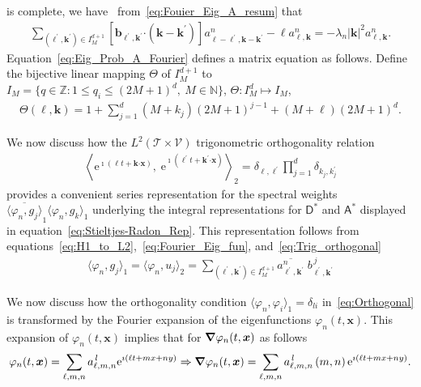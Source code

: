 \documentclass[leqno,onefignum,onetabnum]{siamltex1213}
\newcommand{\e}{\mathrm{e}}
\newcommand{\Tc}{\mathcal{T}}
\newcommand{\Vc}{\mathcal{V}}
\newcommand{\Dm}{\mathsf{D}}
\newcommand{\Am}{\mathsf{A}}
\newcommand\bnabla{\mbox{\boldmath${\nabla}$}}
\providecommand\bcdot{\boldsymbol{\cdot}}
\newcommand{\vecb}{\boldsymbol{b}}
\newcommand{\vecx}{\boldsymbol{x}}
\newcommand{\veck}{\boldsymbol{k}}
\begin{document}
is complete, we have~\cite{Stone:64,Keener-2000}
from~\eqref{eq:Fouier_Eig_A_resum} that 
%
\begin{align}\label{eq:Eig_Prob_A_Fourier}
  \sum_{(\ell^\prime,\veck^\prime)\in I_M^{d+1}}
  \left[\vecb_{\ell^\prime,\veck^\prime}\bcdot(\veck-\veck^\prime)
       \right]a^n_{\ell-\ell^\prime,\veck-\veck^\prime}
  -\ell a^n_{\ell,\veck}
  =-\lambda_n|\veck|^2a^n_{\ell,\veck}.
\end{align}
%
Equation~\eqref{eq:Eig_Prob_A_Fourier} defines a matrix equation as
follows. Define the bijective linear mapping $\Theta$ of $I_M^{d+1}$ to 
$I_M=\{q\in\mathbb{Z}:1\leq q_i\leq(2M+1)^d, \ M\in\mathbb{N}\}$,
$\Theta:I^d_M\mapsto I_M$,  
\begin{align}
  \Theta(\ell,\veck)=1+\sum_{j=1}^{d}(M+k_j)(2M+1)^{j-1}+(M+\ell)(2M+1)^d.
\end{align}
%


We now discuss how the $L^2(\Tc\times\Vc)$ trigonometric orthogonality
relation   
%
\begin{align}\label{eq:Trig_orthogonal}  
      \left\langle
      \e^{\imath (\ell t+\veck\bcdot\vecx)},\;\e^{\imath (\ell^\prime t+\veck^\prime\bcdot\vecx)}
      \right\rangle_2
      =\delta_{\ell,\ell^\prime}\prod_{j=1}^d\delta_{k_j,k_j^\prime}
\end{align}
%
provides a convenient series representation for the spectral weights 
$\overline{\langle\varphi_n,g_j\rangle}_1\langle\varphi_n,g_k\rangle_1$ underlying the integral
representations for $\Dm^*$ and $\Am^*$ displayed in
equation~\eqref{eq:Stieltjes-Radon_Rep}. This representation follows
from equations~\eqref{eq:H1_to_L2},~\eqref{eq:Fourier_Eig_fun},
and~\eqref{eq:Trig_orthogonal} 
%
\begin{align}
  \langle\varphi_n,g_j\rangle_1=\langle\varphi_n,u_j\rangle_2=\sum_{(\ell^\prime,\veck^\prime)\in I_M^{d+1}}
   \overline{a^n_{\ell^\prime,\veck^\prime}}\;b^{\,j}_{\ell^\prime,\veck^\prime}
\end{align}
%



We now discuss how the orthogonality condition
$\langle\varphi_n,\varphi_i\rangle_1=\delta_{li}$ in~\eqref{eq:Orthogonal} is
transformed by the Fourier expansion of the
eigenfunctions $\varphi_n(t,\vecx)$. This expansion of $\varphi_n(t,\vecx)$ 
implies that for $\bnabla \varphi_n(t,\vecx)$ as follows 
%
\begin{align}\label{eq:Eigenfunction_Grad_expansion}
  \varphi_n(t,\vecx)=\sum_{\ell,m,n}a^{\,l}_{\ell,m,n}\e^{\imath (\ell t+mx+ny)}\Rightarrow
  \bnabla \varphi_n(t,\vecx)=\sum_{\ell,m,n}a^{\,l}_{\ell,m,n}\,(m,n)\,\e^{\imath (\ell t+mx+ny)}.
\end{align}
%
\end{document}
